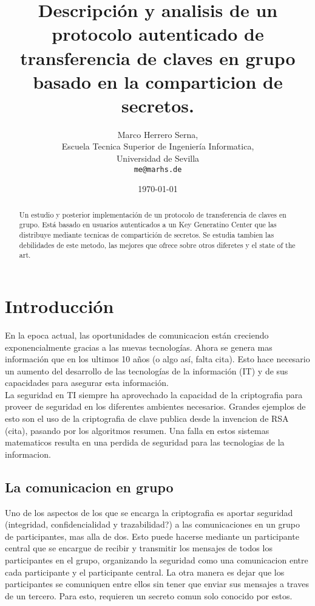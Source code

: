 \documentclass[10pt, a4paper, spanish]{report}
\begin{document}
\title{Descripción y analisis de un protocolo autenticado de transferencia de claves en grupo basado en la comparticion de secretos.}
\author{Marco Herrero Serna,\\
        Escuela Tecnica Superior de Ingeniería Informatica,\\
        Universidad de Sevilla\\
        \texttt{me@marhs.de}}
\date{\today}
\maketitle


\begin{abstract}
Un estudio y posterior implementación de un protocolo de transferencia de claves en grupo. Está basado en usuarios autenticados a un Key Generatino Center que las distribuye mediante tecnicas de compartición de secretos. Se estudia tambien las debilidades de este metodo, las mejores que ofrece sobre otros diferetes y el state of the art. 
\end{abstract}

\section{Introducción}
 

En la epoca actual, las oportunidades de comunicacion están creciendo exponencialmente gracias a las nuevas tecnologías. Ahora se genera mas información que en los ultimos 10 años (o algo así, falta cita). Esto hace necesario un aumento del desarrollo de las tecnologías de la información (IT) y de sus capacidades para asegurar esta información. \\

La seguridad en TI siempre ha aprovechado la capacidad de la criptografia para proveer de seguridad en los diferentes ambientes necesarios. Grandes ejemplos de esto son el uso de la criptografia de clave publica desde la invencion de RSA (cita), pasando por los algoritmos resumen. Una falla en estos sistemas matematicos resulta en una perdida de seguridad para las tecnologias de la informacion. \\

    \subsection{La comunicacion en grupo}
    Uno de los aspectos de los que se encarga la criptografia es aportar seguridad (integridad, confidencialidad y trazabilidad?) a las comunicaciones en un grupo de participantes, mas alla de dos. Esto puede hacerse mediante un participante central que se encargue de recibir y transmitir los mensajes de todos los participantes en el grupo, organizando la seguridad como una comunicacion entre cada participante y el participante central. La otra manera es dejar que los participantes se comuniquen entre ellos sin tener que enviar sus mensajes a traves de un tercero. Para esto, requieren un secreto comun solo conocido por estos.
\end{document}
